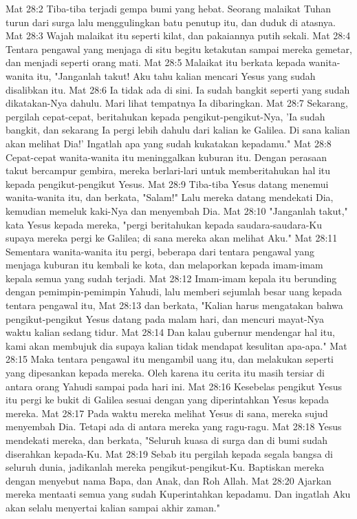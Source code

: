 Mat 28:2  Tiba-tiba terjadi gempa bumi yang hebat. Seorang malaikat Tuhan turun dari surga lalu menggulingkan batu penutup itu, dan duduk di atasnya.
Mat 28:3  Wajah malaikat itu seperti kilat, dan pakaiannya putih sekali.
Mat 28:4  Tentara pengawal yang menjaga di situ begitu ketakutan sampai mereka gemetar, dan menjadi seperti orang mati.
Mat 28:5  Malaikat itu berkata kepada wanita-wanita itu, "Janganlah takut! Aku tahu kalian mencari Yesus yang sudah disalibkan itu.
Mat 28:6  Ia tidak ada di sini. Ia sudah bangkit seperti yang sudah dikatakan-Nya dahulu. Mari lihat tempatnya Ia dibaringkan.
Mat 28:7  Sekarang, pergilah cepat-cepat, beritahukan kepada pengikut-pengikut-Nya, 'Ia sudah bangkit, dan sekarang Ia pergi lebih dahulu dari kalian ke Galilea. Di sana kalian akan melihat Dia!' Ingatlah apa yang sudah kukatakan kepadamu."
Mat 28:8  Cepat-cepat wanita-wanita itu meninggalkan kuburan itu. Dengan perasaan takut bercampur gembira, mereka berlari-lari untuk memberitahukan hal itu kepada pengikut-pengikut Yesus.
Mat 28:9  Tiba-tiba Yesus datang menemui wanita-wanita itu, dan berkata, "Salam!" Lalu mereka datang mendekati Dia, kemudian memeluk kaki-Nya dan menyembah Dia.
Mat 28:10  "Janganlah takut," kata Yesus kepada mereka, "pergi beritahukan kepada saudara-saudara-Ku supaya mereka pergi ke Galilea; di sana mereka akan melihat Aku."
Mat 28:11  Sementara wanita-wanita itu pergi, beberapa dari tentara pengawal yang menjaga kuburan itu kembali ke kota, dan melaporkan kepada imam-imam kepala semua yang sudah terjadi.
Mat 28:12  Imam-imam kepala itu berunding dengan pemimpin-pemimpin Yahudi, lalu memberi sejumlah besar uang kepada tentara pengawal itu,
Mat 28:13  dan berkata, "Kalian harus mengatakan bahwa pengikut-pengikut Yesus datang pada malam hari, dan mencuri mayat-Nya waktu kalian sedang tidur.
Mat 28:14  Dan kalau gubernur mendengar hal itu, kami akan membujuk dia supaya kalian tidak mendapat kesulitan apa-apa."
Mat 28:15  Maka tentara pengawal itu mengambil uang itu, dan melakukan seperti yang dipesankan kepada mereka. Oleh karena itu cerita itu masih tersiar di antara orang Yahudi sampai pada hari ini.
Mat 28:16  Kesebelas pengikut Yesus itu pergi ke bukit di Galilea sesuai dengan yang diperintahkan Yesus kepada mereka.
Mat 28:17  Pada waktu mereka melihat Yesus di sana, mereka sujud menyembah Dia. Tetapi ada di antara mereka yang ragu-ragu.
Mat 28:18  Yesus mendekati mereka, dan berkata, "Seluruh kuasa di surga dan di bumi sudah diserahkan kepada-Ku.
Mat 28:19  Sebab itu pergilah kepada segala bangsa di seluruh dunia, jadikanlah mereka pengikut-pengikut-Ku. Baptiskan mereka dengan menyebut nama Bapa, dan Anak, dan Roh Allah.
Mat 28:20  Ajarkan mereka mentaati semua yang sudah Kuperintahkan kepadamu. Dan ingatlah Aku akan selalu menyertai kalian sampai akhir zaman."


